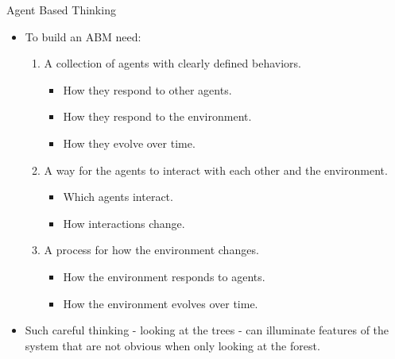 \begin{frame}{Agent Based Thinking}
	\begin{itemize}
		\item To build an ABM need:
		\begin{enumerate}
			\item A collection of agents with clearly defined behaviors.
			\begin{itemize}
				\item How they respond to other agents.
				\item How they respond to the environment.
				\item How they evolve over time.
			\end{itemize}
			\item A way for the agents to interact with each other and the environment.
			\begin{itemize}
				\item Which agents interact.
				\item How interactions change.
			\end{itemize}
			\item A process for how the environment changes.
			\begin{itemize}
				\item How the environment responds to agents.
				\item How the environment evolves over time.
			\end{itemize}
		\end{enumerate} 
		\item Such careful thinking - looking at the trees - can illuminate features of the system that are not obvious when only looking at the forest.
	\end{itemize}
\end{frame}


